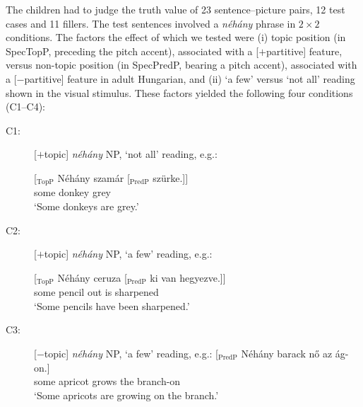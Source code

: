\documentclass[output=paper]{langscibook}
\begin{document}
The children had to judge the truth value of 23 sentence–picture pairs, 12 test cases and 11 fillers. The test sentences involved a \textit{néhány} phrase in $2\times 2$ conditions. The factors the effect of which we tested were (i) topic position (in SpecTopP, preceding the pitch accent), associated with a [$+$partitive] feature, versus non-topic position (in SpecPredP, bearing a pitch accent), associated with a [$-$partitive] feature in adult Hungarian, and (ii) `a few' versus `not all' reading shown in the visual stimulus. These factors yielded the following four conditions (C1--C4):

\begin{description}
\item[C1:] [$+$topic] \textit{néhány} NP, `not all' reading, e.g.:

\ea
\gll \label{kis-zet:szamar} [$_\text{TopP}$ 	Néhány 	szamár 	[$_\text{PredP}$ 	szürke.]]\\  
     {} {} some donkey {} grey\\ 
\glt `Some donkeys are grey.'
\z


\item[C2:] [$+$topic] \textit{néhány} NP, `a few' reading, e.g.:

\ea
\gll \label{kis-zet:ceruza} [$_\text{TopP}$ 	Néhány ceruza 	[$_\text{PredP}$ 	ki 		van 	hegyezve.]]\\  
    {} {} some pencil {} out is sharpened\\ 
\glt `Some pencils have been sharpened.'
\z



\item[C3:] [$-$topic] \textit{néhány} NP, `a few' reading, e.g.:
\ea
\gll \label{kis-zet:barack}[$_\text{PredP}$ Néhány barack nő az ág-on.]\\ {} some apricot grows the branch-on\\ 
\glt `Some apricots are growing on the branch.'
\z


\end{description}
\end{document}
